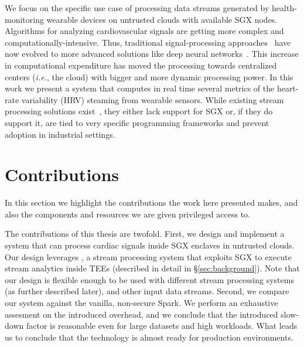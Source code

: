 We focus on the specific use case of processing data streams generated by health-monitoring wearable devices on untrusted clouds with available SGX nodes.
Algorithms for analyzing cardiovascular signals are getting more complex and computationally-intensive.
Thus, traditional signal-processing approaches~\cite{Kumar2016} have now evolved to more advanced solutions like deep neural networks~\cite{Xiong2018,VanZaen2019}.
This increase in computational expenditure has moved the processing towards centralized centers (\textit{i.e.}, the cloud) with bigger and more dynamic processing power.%
In this work we present a system that computes in real time several metrics of the heart-rate variability (HRV) steaming from wearable sensors.
While existing stream processing solutions exist~\cite{spark-streaming-documentation,Havet2017}, they either lack support for SGX or, if they do support it, are tied to very specific programming frameworks and prevent adoption in industrial settings.

\section{Contributions}

In this section we highlight the contributions the work here presented makes, and also the components and resources we are given privileged access to.

The contributions of this thesis are twofold.
First, we design and implement a system that can process cardiac signals inside SGX enclaves in untrusted clouds.
Our design leverages \sgxspark, a stream processing system that exploits SGX to execute stream analytics inside TEEs (described in detail in \S\ref{sec:background}).
Note that our design is flexible enough to be used with different stream processing systems (as further described later), and other input data streams.
Second, we compare our system against the vanilla, non-secure Spark.
We perform an exhaustive assesment on the introduced overhead, and we conclude that the introduced slow-down factor is reasonable even for large datasets and high workloads.
What leads us to conclude that the technology is almost ready for production environments.

